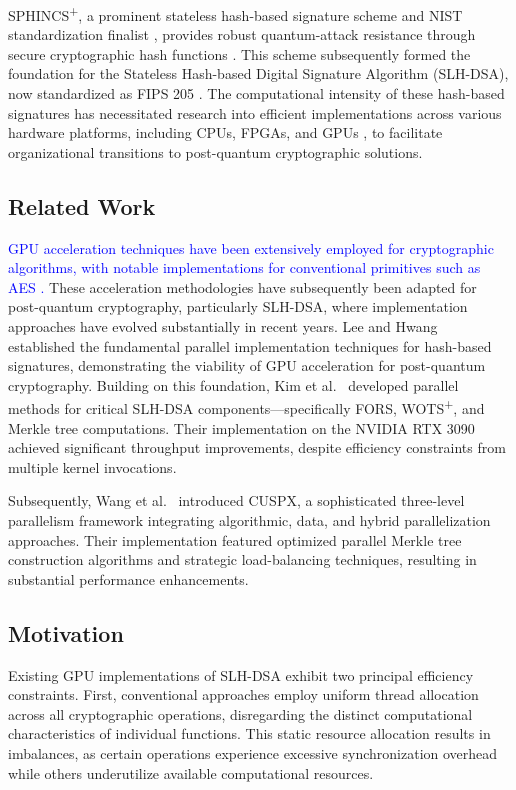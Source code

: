 \documentclass[journal]{IEEEtran}
\begin{document}
SPHINCS\textsuperscript{+}, a prominent stateless hash-based signature scheme and NIST standardization finalist \cite{Yesina}, provides robust quantum-attack resistance through secure cryptographic hash functions \cite{Bernstein2019}. This scheme subsequently formed the foundation for the Stateless Hash-based Digital Signature Algorithm (SLH-DSA), now standardized as FIPS 205 \cite{FIPS205}. The computational intensity of these hash-based signatures has necessitated research into efficient implementations across various hardware platforms, including CPUs, FPGAs, and GPUs \cite{Joseph2022}, to facilitate organizational transitions to post-quantum cryptographic solutions.

\subsection{Related Work}

\textcolor{blue}{GPU acceleration techniques have been extensively employed for cryptographic algorithms, with notable implementations for conventional primitives such as AES \cite{Lee2022a}.} These acceleration methodologies have subsequently been adapted for post-quantum cryptography, particularly SLH-DSA, where implementation approaches have evolved substantially in recent years.
Lee and Hwang~\cite{Lee2022} established the fundamental parallel implementation techniques for hash-based signatures, demonstrating the viability of GPU acceleration for post-quantum cryptography. Building on this foundation, Kim et al.~\cite{Kim2024} developed parallel methods for critical SLH-DSA components—specifically FORS, WOTS\textsuperscript{+}, and Merkle tree computations. Their implementation on the NVIDIA RTX 3090 achieved significant throughput improvements, despite efficiency constraints from multiple kernel invocations.

Subsequently, Wang et al.~\cite{Wang2025} introduced CUSPX, a sophisticated three-level parallelism framework integrating algorithmic, data, and hybrid parallelization approaches. Their implementation featured optimized parallel Merkle tree construction algorithms and strategic load-balancing techniques, resulting in substantial performance enhancements.

\subsection{Motivation}

Existing GPU implementations of SLH-DSA exhibit two principal efficiency constraints. First, conventional approaches employ uniform thread allocation across all cryptographic operations, disregarding the distinct computational characteristics of individual functions. This static resource allocation results in imbalances, as certain operations experience excessive synchronization overhead while others underutilize available computational resources.
\end{document}
